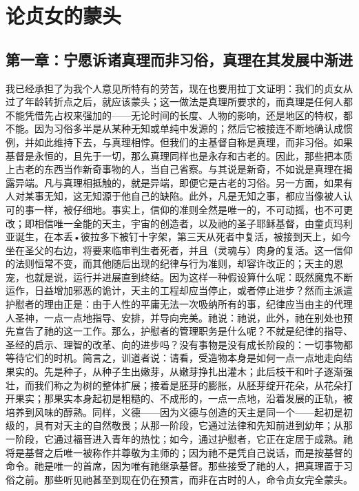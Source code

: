 
\chapter{论贞女的蒙头}



\section{第一章：宁愿诉诸真理而非习俗，真理在其发展中渐进}

我已经承担了为我个人意见所特有的劳苦，现在也要用拉丁文证明：我们的贞女从过了年龄转折点之后，就应该蒙头；这一做法是真理所要求的，而真理是任何人都不能凭借先占权来强加的——无论时间的长度、人物的影响，还是地区的特权，都不能。因为习俗多半是从某种无知或单纯中发源的；然后它被接连不断地确认成惯例，并如此维持下去，与真理相悖。但我们的主基督自称是真理，而非习俗。如果基督是永恒的，且先于一切，那么真理同样也是永存和古老的。因此，那些把本质上古老的东西当作新奇事物的人，当自己省察。与其说是新奇，不如说是真理在揭露异端。凡与真理相抵触的，就是异端，即便它是古老的习俗。另一方面，如果有人对某事无知，这无知源于他自己的缺陷。此外，凡是无知之事，都应当像被人认可的事一样，被仔细地。事实上，信仰的准则全然是唯一的，不可动摇，也不可更改；即相信唯一全能的天主，宇宙的创造者，以及祂的圣子耶稣基督，由童贞玛利亚诞生，在本丢•彼拉多下被钉十字架，第三天从死者中复活，被接到天上，如今坐在圣父的右边，将要来临审判生者死者，并且（灵魂与）肉身的复活。这一信仰的法则恒常不变，而其他随后出现的纪律与行为准则，却容许改正的；天主的恩宠，也就是说，运行并进展直到终结。因为这样一种假设算什么呢：既然魔鬼不断运作，日益增加邪恶的诡计，天主的工程却应当停止，或者停止进步？然而主派遣护慰者的理由正是：由于人性的平庸无法一次吸纳所有的事，纪律应当由主的代理人圣神，一点一点地指导、安排，并导向完美。祂说：祂说，此外，祂在别处也预先宣告了祂的这一工作。那么，护慰者的管理职务是什么呢？不就是纪律的指导、圣经的启示、理智的改革、向的进步吗？没有事物是没有成长阶段的：一切事物都等待它们的时机。简言之，训道者说：请看，受造物本身是如何一点一点地走向结果实的。先是种子，从种子生出嫩芽，从嫩芽挣扎出灌木；此后枝干和叶子逐渐强壮，而我们称之为树的整体扩展；接着是胚芽的膨胀，从胚芽绽开花朵，从花朵打开果实；那果实本身起初是粗糙的、不成形的，一点一点地，沿着发展的正轨，被培养到风味的醇熟。同样，义德——因为义德与创造的天主是同一个——起初是初级的，具有对天主的自然敬畏；从那一阶段，它通过法律和先知前进到幼年；从那一阶段，它通过福音进入青年的热忱；如今，通过护慰者，它正在定居于成熟。祂将是基督之后唯一被称作并尊敬为主师的；因为祂不是凭自己说话，而是按基督的命令。祂是唯一的首席，因为唯有祂继承基督。那些接受了祂的人，把真理置于习俗之前。那些听见祂甚至到现在仍在预言，而非在古时的人，命令贞女完全蒙头。\par

